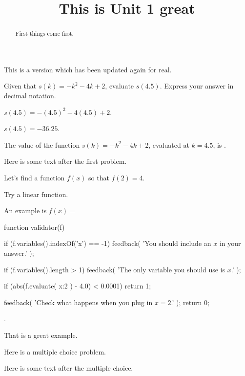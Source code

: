 \documentclass{ximera}
\title{This is Unit 1 great}
\begin{document}
\begin{abstract}
  First things come first.
\end{abstract}


This is a version which has been updated again for real.

\begin{exercise}
Given that $s(k)=-k^2-4 k+2$, evaluate $s(4.5)$. Express your answer in decimal notation.
\begin{solution}
\begin{hint}
$s(4.5)=-(4.5)^2-4 (4.5)+2$.
\end{hint}
\begin{hint}
$s(4.5)=-36.25$.
\end{hint}
The value of the function $s(k)=-k^2-4 k+2$, evaluated at $k=4.5$, is .
\end{solution}

Here is some text after the first problem.
\end{exercise}


\begin{exercise}
Let's find a function $f(x)$ so that $f(2) = 4$.

\begin{solution}
\begin{hint}
Try a linear function.
\end{hint}
An example is $f(x) = $ \begin{expression-answer}
  function validator(f) {
    if (f.variables().indexOf('x') == -1) {
      feedback( 'You should include an $x$ in your answer.' );
    }

    if (f.variables().length > 1) {
      feedback( 'The only variable you should use is $x$.' );
    }

    if (abs(f.evaluate( {x:2} ) - 4.0) < 0.0001)
      return 1;

    feedback( 'Check what happens when you plug in $x=2$.' );
    return 0;
  }
\end{expression-answer}.
\end{solution}

That is a great example.
\end{exercise}

\begin{exercise}
  Here is a multiple choice problem.

  \begin{solution}
    \begin{multiple-choice}
    \end{multiple-choice}
  \end{solution}

  Here is some text after the multiple choice.
\end{exercise}
\end{document}
